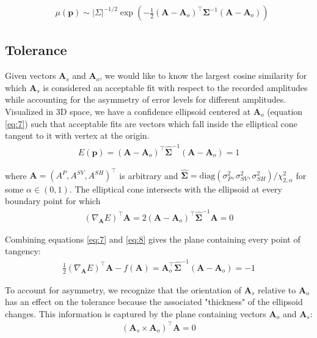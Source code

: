 \documentclass[preprint]{seismica}
\begin{document}
    \begin{align} \label{eq:6}
      &\mu(\bm{p}) \sim |\Sigma|^{-1/2} \exp \left( - \frac{1}{2} (\bm{A} - \bm{A}_o)^\top \bm{\Sigma}^{-1} (\bm{A} - \bm{A}_o) \right)
    \end{align}

    \subsection{Tolerance}
    Given vectors $\bm{A}_s$ and $\bm{A}_o$, we would like to know the largest cosine
    similarity for which $\bm{A}_s$ is considered an acceptable fit with respect to the recorded amplitudes
    while accounting for the asymmetry of error levels for different amplitudes. Visualized in 3D
    space, we have a confidence ellipsoid centered at $\bm{A}_o$ (equation \ref{eq:7}) such that
    acceptable fits are vectors which fall inside the elliptical cone tangent to it with vertex at the
    origin.
    \begin{align} \label{eq:7}
      E(\bm{p}) = (\bm{A} - \bm{A}_o)^\top \hat{\bm{\Sigma}}^{-1} (\bm{A} - \bm{A}_o)  = 1
    \end{align}
    
    \noindent where $\bm{A} = (A^P, A^{SV}, A^{SH})^\top$ is arbitrary
    and $\hat{\bm{\Sigma}} = \text{diag}(\sigma_P^2, \sigma_{SV}^2, \sigma_{SH}^2)/\chi^2_{2,\alpha}$ for some $\alpha \in (0,1)$. The elliptical
    cone intersects with the ellipsoid at every boundary point for which
    \begin{align} \label{eq:8}
      (\nabla_{\bm{A}} E)^\top \bm{A} = 2(\bm{A} - \bm{A}_o)^\top \hat{\bm{\Sigma}}^{-1} \bm{A} = 0
    \end{align}
    
    Combining equations \ref{eq:7} and \ref{eq:8} gives the plane containing every point of 
    tangency:
    \begin{align} \label{eq:9}
      \frac{1}{2} (\nabla_{\bm{A}} E)^\top \bm{A} - f(\bm{A}) = 
              \bm{A}_o^\top \hat{\bm{\Sigma}}^{-1} (\bm{A} - \bm{A}_o)  = -1
    \end{align}

    To account for asymmetry, we recognize that the orientation of $\bm{A}_s$ relative to $\bm{A}_o$
    has an effect on the tolerance because the associated "thickness" of the ellipsoid changes.
    This information is captured by the plane containing vectors $\bm{A}_o$ and $\bm{A}_s$:
    \begin{align} \label{eq:10}
      (\bm{A}_s \times \bm{A}_o)^\top \bm{A} = 0
    \end{align}
\end{document}
